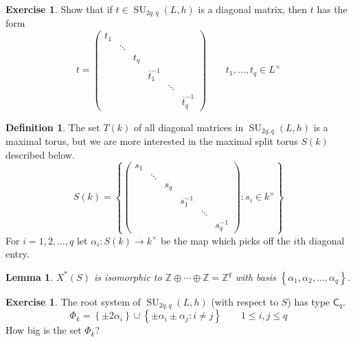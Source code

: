 \documentclass[12pt]{article}
\newtheorem{lemma}[theorem]{Lemma}
\theoremstyle{definition}
\newtheorem{definition}[theorem]{Definition}
\newtheorem{exercise}[theorem]{Exercise}
\newcommand{\Z}{\mathbb{Z}}
\newcommand{\lb}{\left\{}
\newcommand{\rb}{\right\}}
\newcommand{\inv}{^{-1}}
\newcommand{\ov}{\overline}
\DeclareMathOperator{\SU}{SU}
\begin{document}
\begin{exercise}
Show that if $t \in \SU_{2q,q}(L,h)$ is a diagonal matrix, then $t$ has the form
\[
	t = \begin{pmatrix}
		t_1 \\
		& \ddots \\
		&& t_q \\
		&&& \ov t_1 \inv \\
		&&&& \ddots \\
		&&&&& \ov t_q \inv
	\end{pmatrix}
	\qquad t_1, \ldots, t_q \in L^\times
\]
\end{exercise}

\begin{definition}
The set $T(k)$ of all diagonal matrices in $\SU_{2q,q}(L,h)$ is a maximal torus, but we are more interested in the maximal split torus $S(k)$ described below.
\[
	S(k) =
	\lb
	\begin{pmatrix}
		s_1 \\
		& \ddots \\
		&& s_q \\
		&&& s_1 \inv \\
		&&&& \ddots \\
		&&&&& s_q \inv
	\end{pmatrix}
		: s_i \in k^\times
	\rb
\]
For $i=1, 2, \ldots, q$ let $\alpha_i:S(k) \to k^\times$ be the map which picks off the $i$th diagonal entry.
\end{definition}

\begin{lemma}
$X^*(S)$ is isomorphic to $\Z \oplus \cdots \oplus \Z = \Z^q$ with basis $\lb \alpha_1, \alpha_2, \ldots, \alpha_q \rb$.
\end{lemma}

\begin{exercise}
The root system of $\SU_{2q,q}(L,h)$ (with respect to $S$) has type $\mathsf{C}_q$.
\[
	\Phi_k = \lb \pm 2 \alpha_i \rb \cup \lb \pm \alpha_i \pm \alpha_j : i \neq j \rb \qquad 1 \le i,j \le q
\]
How big is the set $\Phi_k$?
\end{exercise}
\end{document}
